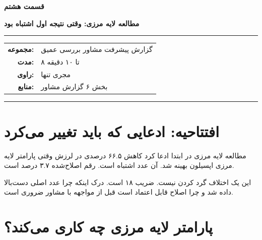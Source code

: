 \documentclass[12pt, a4paper]{article}
\newcommand{\dash}{\lr{---}}
\begin{document}

\thispagestyle{empty}

\vspace*{1.2cm}

{\centering
{\color{seriesblue}\fontsize{24}{30}\selectfont\bfseries قسمت هشتم}

\vspace{0.5cm}
{\fontsize{15}{20}\selectfont\bfseries مطالعه لايه مرزی: وقتی نتيجه اول اشتباه بود}

\vspace{0.9cm}
{\color{seriesblue}\rule{0.55\linewidth}{1pt}}
\vspace{0.7cm}

{\normalsize
\begin{tabular}{rl}
  \textbf{مجموعه:}     & گزارش پيشرفت مشاور \dash{} بررسی عمیق \\[5pt]
  \textbf{مدت:}        & ۸ تا ۱۰ دقیقه \\[5pt]
  \textbf{راوی:}       & مجری تنها \\[5pt]
  \textbf{منابع:}      & بخش ۶ گزارش مشاور \\
\end{tabular}
}

\vspace{0.9cm}
{\color{seriesblue}\rule{0.55\linewidth}{0.4pt}}
\par}

\vspace{1.2cm}

\section{افتتاحیه: ادعايی که بايد تغيير می‌کرد}

مطالعه لايه مرزی  در ابتدا ادعا کرد کاهش ۶۶.۵ درصدی در لرزش وقتی پارامتر لايه مرزی اپسيلون بهينه شد. آن عدد اشتباه است. رقم اصلاح‌شده ۳.۷ درصد است.

اين يک اختلاف گرد کردن نيست. ضريب ۱۸ است. درک اينکه چرا عدد اصلی دست‌بالا داده شد \dash{} و چرا اصلاح قابل اعتماد است \dash{} قبل از مواجهه با مشاور ضروری است.

\section{پارامتر لايه مرزی چه کاری می‌کند؟}
\end{document}
